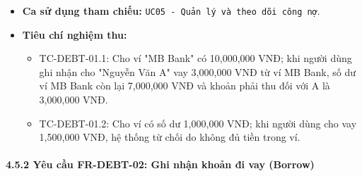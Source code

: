 \documentclass[11pt,a4paper]{article}
\providecommand{\tightlist}{
  \setlength{\itemsep}{0pt}\setlength{\parskip}{0pt}}
\begin{document}
\begin{itemize}
  \begin{itemize}
  \tightlist
  \item
    Bản ghi công nợ mới được lưu vào bảng \texttt{debt} với loại nghiệp
    vụ \texttt{lend} kèm mã định danh duy nhất (\texttt{debtId}).
  \item
    Số dư ví xuất tiền giảm đúng bằng số tiền cho vay.
  \item
    Số dư phải thu đối với người vay tăng tương ứng.
  \item
    Thông báo ghi nhận khoản cho vay thành công.
  \end{itemize}
\item
  \textbf{Ca sử dụng tham chiếu:}
  \texttt{UC05\ -\ Quản\ lý\ và\ theo\ dõi\ công\ nợ}.
\item
  \textbf{Tiêu chí nghiệm thu:}

  \begin{itemize}
  \tightlist
  \item
    TC-DEBT-01.1: Cho ví "MB Bank" có 10,000,000 VNĐ; khi người dùng ghi
    nhận cho "Nguyễn Văn A" vay 3,000,000 VNĐ từ ví MB Bank, số dư ví MB
    Bank còn lại 7,000,000 VNĐ và khoản phải thu đối với A là 3,000,000
    VNĐ.
  \item
    TC-DEBT-01.2: Cho ví có số dư 1,000,000 VNĐ; khi người dùng cho vay
    1,500,000 VNĐ, hệ thống từ chối do không đủ tiền trong ví.
  \end{itemize}
\end{itemize}

\newpage

\paragraph{4.5.2 Yêu cầu FR-DEBT-02: Ghi nhận khoản đi vay
(Borrow)}\label{452-yuxeau-cux1ea7u-fr-debt-02-ghi-nhux1eadn-khoux1ea3n-ux111i-vay-borrow}
\end{document}
